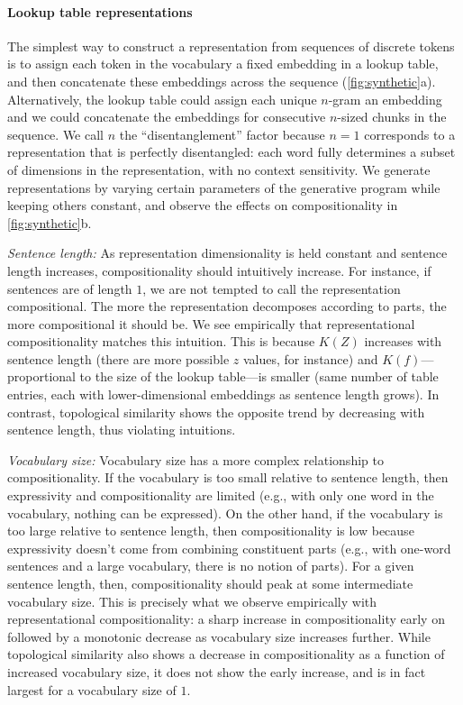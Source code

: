 \documentclass{article} %
\newcommand{\comp}{representational compositionality}
\begin{document}
\paragraph{Lookup table representations}

The simplest way to construct a representation from sequences of discrete tokens is to assign each token in the vocabulary a fixed embedding in a lookup table, and then concatenate these embeddings across the sequence (\cref{fig:synthetic}a). Alternatively, the lookup table could assign each unique $n$-gram an embedding and we could concatenate the embeddings for consecutive $n$-sized chunks in the sequence. We call $n$ the ``disentanglement'' factor because $n=1$ corresponds to a representation that is perfectly disentangled: each word fully determines a subset of dimensions in the representation, with no context sensitivity. We generate representations by varying certain parameters of the generative program while keeping others constant, and observe the effects on compositionality in \cref{fig:synthetic}b.

\textit{Sentence length:} As representation dimensionality is held constant and sentence length increases, compositionality should intuitively increase. For instance, if sentences are of length $1$, we are not tempted to call the representation compositional. The more the representation decomposes according to parts, the more compositional it should be. We see empirically that \comp{} matches this intuition. This is because $K(Z)$ increases with sentence length (there are more possible $z$ values, for instance) and $K(f)$---proportional to the size of the lookup table---is smaller (same number of table entries, each with lower-dimensional embeddings as sentence length grows). In contrast, topological similarity shows the opposite trend by decreasing with sentence length, thus violating intuitions.

\textit{Vocabulary size:} Vocabulary size has a more complex relationship to compositionality. If the vocabulary is too small relative to sentence length, then expressivity and compositionality are limited (e.g., with only one word in the vocabulary, nothing can be expressed). On the other hand, if the vocabulary is too large relative to sentence length, then compositionality is low because expressivity doesn't come from combining constituent parts (e.g., with one-word sentences and a large vocabulary, there is no notion of parts). For a given sentence length, then, compositionality should peak at some intermediate vocabulary size. This is precisely what we observe empirically with \comp{}: a sharp increase in compositionality early on followed by a monotonic decrease as vocabulary size increases further. While topological similarity also shows a decrease in compositionality as a function of increased vocabulary size, it does not show the early increase, and is in fact largest for a vocabulary size of $1$.
\end{document}
